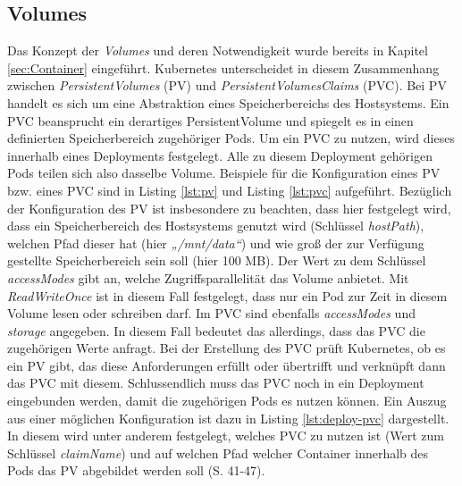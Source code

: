 \documentclass[11pt,a4paper]{article}
\begin{document}
\subsection{Volumes}
Das Konzept der \emph{Volumes} und deren Notwendigkeit wurde bereits in Kapitel \ref{sec:Container} eingeführt.
Kubernetes unterscheidet in diesem Zusammenhang zwischen \emph{PersistentVolumes} (PV) und \emph{PersistentVolumesClaims} (PVC).
Bei PV handelt es sich um eine Abstraktion eines Speicherbereichs des Hostsystems.
Ein PVC beansprucht ein derartiges PersistentVolume und spiegelt es in einen
definierten Speicherbereich zugehöriger Pods. Um ein PVC zu nutzen, wird dieses innerhalb eines Deployments festgelegt.
Alle zu diesem Deployment gehörigen Pods teilen sich also dasselbe Volume.
Beispiele für die Konfiguration eines PV bzw. eines PVC sind in Listing \ref{lst:pv} und Listing \ref{lst:pvc}
aufgeführt. Bezüglich der Konfiguration des PV ist insbesondere zu beachten, dass hier
festgelegt wird, dass ein Speicherbereich des Hostsystems genutzt wird (Schlüssel \emph{hostPath}),
welchen Pfad dieser hat (hier \emph{„/mnt/data“})
und wie groß der zur Verfügung gestellte Speicherbereich sein soll (hier 100 MB).
Der Wert zu dem Schlüssel \emph{accessModes} gibt an, welche Zugriffsparallelität das Volume anbietet.
Mit \emph{ReadWriteOnce} ist in diesem Fall festgelegt, dass nur ein Pod zur Zeit
in diesem Volume lesen oder schreiben darf.
Im PVC sind ebenfalls \emph{accessModes} und \emph{storage} angegeben. In diesem Fall
bedeutet das allerdings, dass das PVC die zugehörigen Werte anfragt.
Bei der Erstellung des PVC prüft Kubernetes, ob es ein PV gibt,
das diese Anforderungen erfüllt oder übertrifft und verknüpft dann das PVC mit diesem.
Schlussendlich muss das PVC noch in ein Deployment eingebunden werden, damit die zugehörigen
Pods es nutzen können. Ein Auszug aus einer möglichen Konfiguration ist dazu in
Listing \ref{lst:deploy-pvc} dargestellt. In diesem wird unter anderem festgelegt,
welches PVC zu nutzen ist (Wert zum Schlüssel \emph{claimName}) und auf welchen Pfad
welcher Container innerhalb des Pods das PV abgebildet werden soll \cite{Schmeling_Dargatz_2022} (S. 41-47).

% 
% 
% 
\end{document}
